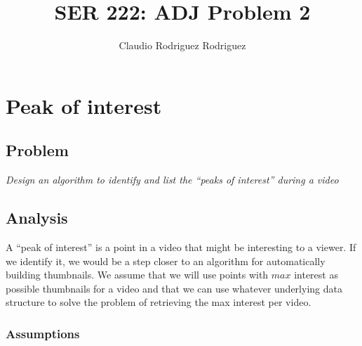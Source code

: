 \documentclass{article}
\begin{document}
\title{SER 222: ADJ Problem 2}
\author{Claudio Rodriguez Rodriguez}
\maketitle







\section{Peak of interest}

\subsection{Problem}

\textit{Design an algorithm to identify and list the ``peaks of interest'' during a video}

\subsection{Analysis}

A ``peak of interest'' is a point in a video that might be interesting to a viewer. If we identify it, we would be a step closer to an algorithm for automatically building thumbnails. We assume that we will use points with $max$ interest as possible thumbnails for a video and that we can use whatever underlying data structure to solve the problem of retrieving the max interest per video. 

\subsubsection{Assumptions}
\end{document}
